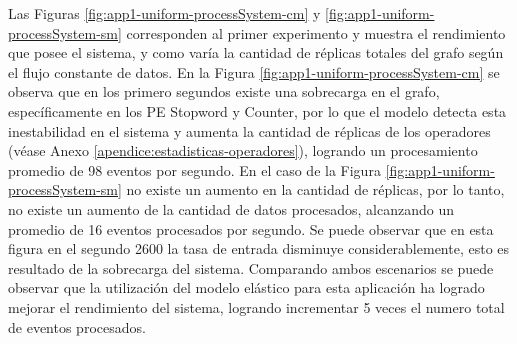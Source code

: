 %
%


Las Figuras \ref{fig:app1-uniform-processSystem-cm} y \ref{fig:app1-uniform-processSystem-sm} \normalsize{corresponden al primer experimento y muestra el rendimiento que posee el sistema, y como varía la cantidad de réplicas totales del grafo según el flujo constante de datos.} En la Figura \ref{fig:app1-uniform-processSystem-cm} \normalsize{se observa que en los primero segundos existe una sobrecarga en el grafo, específicamente en los PE Stopword y Counter, por lo que el modelo detecta esta inestabilidad en el sistema y aumenta la cantidad de réplicas de los operadores} (véase Anexo \ref{apendice:estadisticas-operadores}), \normalsize{logrando un procesamiento promedio de  98 eventos por segundo.} En el caso de la Figura \ref{fig:app1-uniform-processSystem-sm} \normalsize{no existe un aumento en la cantidad de réplicas, por lo tanto, no existe un aumento de la cantidad de datos procesados, alcanzando un promedio de 16 eventos procesados por segundo. Se puede observar que en esta figura en el segundo 2600 la tasa de entrada disminuye considerablemente, esto es resultado de la sobrecarga del sistema. Comparando ambos escenarios se puede observar que la utilización del modelo elástico para esta aplicación ha logrado mejorar el rendimiento del sistema, logrando incrementar 5 veces el numero total de eventos procesados.}

